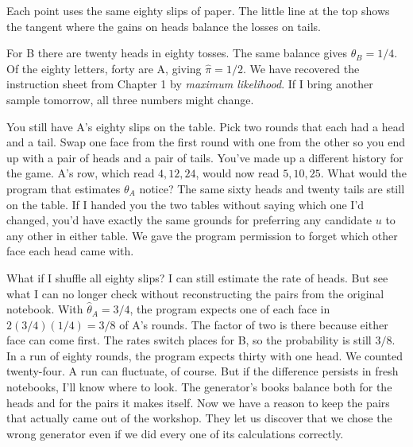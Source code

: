 \par\addvspace{5pt}\noindent\begin{minipage}{\linewidth}\centering
{}\par
{\footnotesize\raggedright Each point uses the same eighty slips of paper. The little line at the top shows the tangent where the gains on heads balance the losses on tails.\par}
\end{minipage}\par\addvspace{5pt}

For B there are twenty heads in eighty tosses. The same balance gives $\widehat\theta_B=1/4$. Of the eighty letters, forty are A, giving $\widehat\pi=1/2$. We have recovered the instruction sheet from Chapter 1 by \emph{maximum likelihood}. If I bring another sample tomorrow, all three numbers might change.

You still have A's eighty slips on the table. Pick two rounds that each had a head and a tail. Swap one face from the first round with one from the other so you end up with a pair of heads and a pair of tails. You've made up a different history for the game. A's row, which read $4,12,24$, would now read $5,10,25$. What would the program that estimates $\theta_A$ notice? The same sixty heads and twenty tails are still on the table. If I handed you the two tables without saying which one I'd changed, you'd have exactly the same grounds for preferring any candidate $u$ to any other in either table. We gave the program permission to forget which other face each head came with.

What if I shuffle all eighty slips? I can still estimate the rate of heads. But see what I can no longer check without reconstructing the pairs from the original notebook. With $\widehat\theta_A=3/4$, the program expects one of each face in $2(3/4)(1/4)=3/8$ of A's rounds. The factor of two is there because either face can come first. The rates switch places for B, so the probability is still $3/8$. In a run of eighty rounds, the program expects thirty with one head. We counted twenty-four. A run can fluctuate, of course. But if the difference persists in fresh notebooks, I'll know where to look. The generator's books balance both for the heads and for the pairs it makes itself. Now we have a reason to keep the pairs that actually came out of the workshop. They let us discover that we chose the wrong generator even if we did every one of its calculations correctly.

